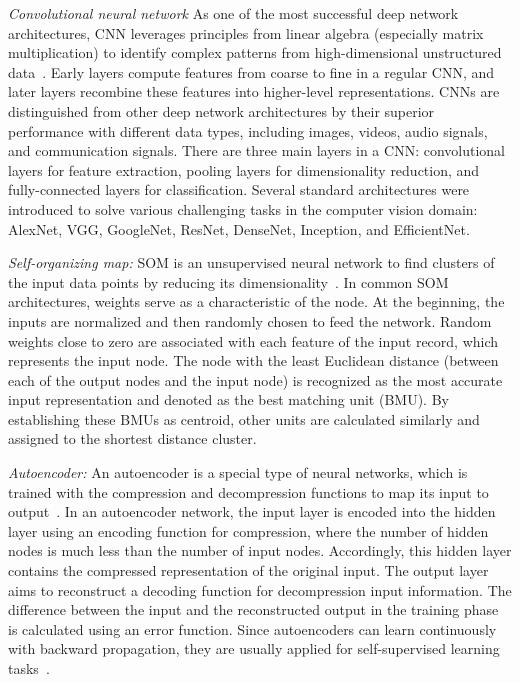 \documentclass[journal]{IEEEtran}
\begin{document}
\textit{Convolutional neural network}
As one of the most successful deep network architectures, CNN leverages principles from linear algebra (especially matrix multiplication) to identify complex patterns from high-dimensional unstructured data~\cite{gonzalez2018deep}.
Early layers compute features from coarse to fine in a regular CNN, and later layers recombine these features into higher-level representations. 
CNNs are distinguished from other deep network architectures by their superior performance with different data types, including images, videos, audio signals, and communication signals.
There are three main layers in a CNN: convolutional layers for feature extraction, pooling layers for dimensionality reduction, and fully-connected layers for classification.
Several standard architectures were introduced to solve various challenging tasks in the computer vision domain: AlexNet, VGG, GoogleNet, ResNet, DenseNet, Inception, and EfficientNet.


\textit{Self-organizing map:}
SOM is an unsupervised neural network to find clusters of the input data points by reducing its dimensionality~\cite{ramos2020forbidden}.
In common SOM architectures, weights serve as a characteristic of the node.
At the beginning, the inputs are normalized and then randomly chosen to feed the network. 
Random weights close to zero are associated with each feature of the input record, which represents the input node.
The node with the least Euclidean distance (between each of the output nodes and the input node) is recognized as the most accurate input representation and denoted as the best matching unit (BMU). 
By establishing these BMUs as centroid, other units are calculated similarly and assigned to the shortest distance cluster.


\textit{Autoencoder:}
An autoencoder is a special type of neural networks, which is trained with the compression and decompression functions to map its input to output~\cite{jing2020self}.
In an autoencoder network, the input layer is encoded into the hidden layer using an encoding function for compression, where the number of hidden nodes is much less than the number of input nodes.
Accordingly, this hidden layer contains the compressed representation of the original input.
The output layer aims to reconstruct a decoding function for decompression input information.
The difference between the input and the reconstructed output in the training phase is calculated using an error function.
Since autoencoders can learn continuously with backward propagation, they are usually applied for self-supervised learning tasks~\cite{song2018self}.
\end{document}

